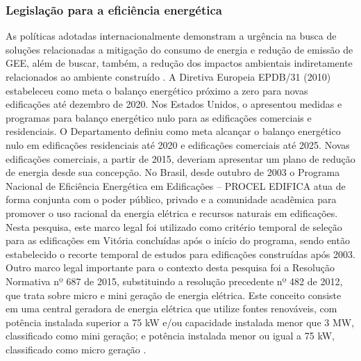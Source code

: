 \begin{onehalfspace}
\subsubsection{Legislação para a eficiência energética}
As políticas adotadas internacionalmente demonstram a urgência na busca de soluções relacionadas a mitigação do consumo de energia e redução de emissão de GEE, além de buscar, também, a redução dos impactos ambientais indiretamente relacionados ao ambiente construído \cite{InternationalMonetaryFund-IMF2018,InternationalEnergyAgency-IEA2018a}.\vspace{0.3cm} \newline
A Diretiva Europeia EPDB/31 (2010) estabeleceu como meta o balanço energético próximo a zero para novas edificações até dezembro de 2020. Nos Estados Unidos, o \textit{\textcite{U.S.DepartmentofEnergy-USDOE2015}} apresentou medidas e programas para balanço energético nulo para as edificações comerciais e residenciais. O Departamento definiu como meta alcançar o balanço energético nulo em edificações residenciais até 2020 e edificações comerciais até 2025. Novas edificações comerciais, a partir de 2015, deveriam apresentar um plano de redução de energia desde sua concepção.\vspace{0.3cm} \newline
No Brasil, desde outubro de 2003 o Programa Nacional de Eficiência Energética em Edificações – PROCEL EDIFICA \cite{Brasil2001,Brasil2001a} atua de forma conjunta com o poder público, privado e a comunidade acadêmica para promover o uso racional da energia elétrica e recursos naturais em edificações. Nesta pesquisa, este marco legal foi utilizado como critério temporal de seleção para as edificações em Vitória concluídas após o início do programa, sendo então estabelecido o recorte temporal de estudos para edificações construídas após 2003.\vspace{0.3cm} \newline
Outro marco legal importante para o contexto desta pesquisa foi a Resolução Normativa nº 687 de 2015, substituindo a resolução precedente nº 482 de 2012, que trata sobre micro e mini geração de energia elétrica. Este conceito consiste em uma central geradora de energia elétrica que utilize fontes renováveis, com potência instalada superior a 75 kW e/ou capacidade instalada menor que 3 MW, classificado como mini geração; e potência instalada menor ou igual a 75 kW, classificado como micro geração \cite{AgenciaNacionaldeEnergiaEletricaANEEL2015}.\vspace{0.3cm} \newline

\end{onehalfspace}
